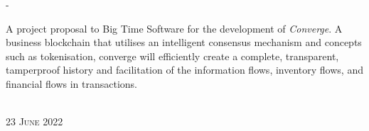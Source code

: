 \begin{titlingpage}
\begin{SingleSpace}
\begin{adjustwidth*}{\unitlength}{-\unitlength}
\begin{center}
\vspace{11mm}
\begin{minipage}{13cm}
	\center A project proposal to Big Time Software for the development of \textit{Converge}. A business blockchain that utilises an intelligent consensus mechanism and concepts such as tokenisation, converge will efficiently create a complete, transparent, tamperproof history and facilitation of the information flows, inventory flows, and financial flows in transactions.
\end{minipage}\\
\vspace{9mm}
{\large\textsc{23 June 2022}}
\vspace{12mm}
\end{center}
\begin{flushright}
\end{flushright}
\end{adjustwidth*}
\end{SingleSpace}
\end{titlingpage}
